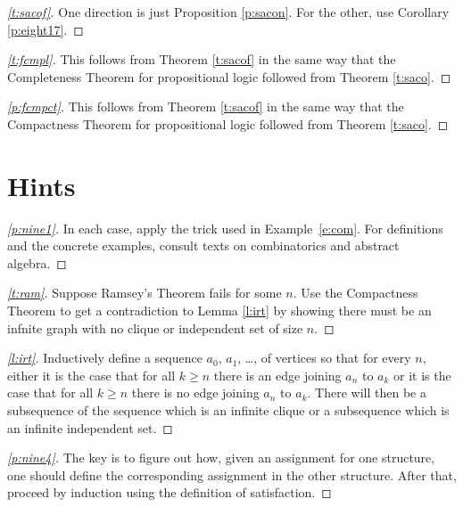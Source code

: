 \documentclass[12pt]{amsbook}
\theoremstyle{plain}
\theoremstyle{definition}
\theoremstyle{remark}
\newenvironment{clue}[1]%
{\begin{proof}[\ref{#1}]}%
{\renewcommand{\qed}{}\end{proof}}
\begin{document}
\begin{clue}{t:sacof}
One direction is just Proposition \ref{p:sacon}.  For the other,  use Corollary \ref{p:eight17}.
\end{clue}

\begin{clue}{t:fcmpl}
This follows from Theorem \ref{t:sacof} in the same way that the Completeness Theorem for propositional logic followed from Theorem \ref{t:saco}.
\end{clue}

\begin{clue}{p:fcmpct}
This follows from Theorem \ref{t:sacof} in the same way that the Compactness Theorem for propositional logic followed from Theorem \ref{t:saco}.
\end{clue}



%
%

\chapter{Hints}

\begin{clue}{p:nine1}
In each case,  apply the trick used in Example~\ref{e:com}.  For definitions and the concrete examples,  consult texts on combinatorics and abstract algebra.
\end{clue}

\begin{clue}{t:ram}
Suppose Ramsey's Theorem fails for some $n$.  Use the Compactness Theorem to get a contradiction to Lemma \ref{l:irt} by showing there must be an infnite graph with no clique or independent set of size $n$.
\end{clue}

\begin{clue}{l:irt}
Inductively define a sequence $a_0$,  $a_1$,  \dots,  of vertices so that for every $n$,  either it is the case that for all $k \ge n$ there is an edge joining $a_n$ to $a_k$ or it is the case that for all $k \ge n$ there is no edge joining $a_n$ to $a_k$.  There will then be a subsequence of the sequence which is an infinite clique or a subsequence which is an infinite independent set. 
\end{clue}

\begin{clue}{p:nine4}
The key is to figure out how,  given an assignment for one structure,  one should define the corresponding assignment in the other structure.  After that,  proceed by induction using the definition of satisfaction.
\end{clue}
\end{document}
